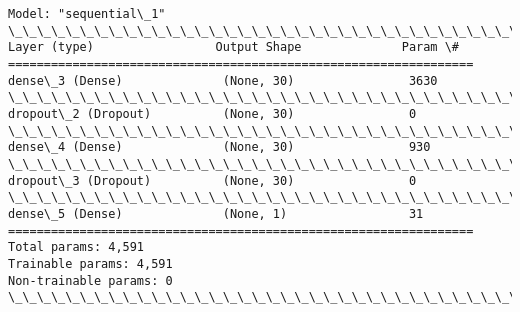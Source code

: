 \documentclass[11pt]{article}
\begin{document}
    \begin{Verbatim}[commandchars=\\\{\}]
Model: "sequential\_1"
\_\_\_\_\_\_\_\_\_\_\_\_\_\_\_\_\_\_\_\_\_\_\_\_\_\_\_\_\_\_\_\_\_\_\_\_\_\_\_\_\_\_\_\_\_\_\_\_\_\_\_\_\_\_\_\_\_\_\_\_\_\_\_\_\_
Layer (type)                 Output Shape              Param \#
=================================================================
dense\_3 (Dense)              (None, 30)                3630
\_\_\_\_\_\_\_\_\_\_\_\_\_\_\_\_\_\_\_\_\_\_\_\_\_\_\_\_\_\_\_\_\_\_\_\_\_\_\_\_\_\_\_\_\_\_\_\_\_\_\_\_\_\_\_\_\_\_\_\_\_\_\_\_\_
dropout\_2 (Dropout)          (None, 30)                0
\_\_\_\_\_\_\_\_\_\_\_\_\_\_\_\_\_\_\_\_\_\_\_\_\_\_\_\_\_\_\_\_\_\_\_\_\_\_\_\_\_\_\_\_\_\_\_\_\_\_\_\_\_\_\_\_\_\_\_\_\_\_\_\_\_
dense\_4 (Dense)              (None, 30)                930
\_\_\_\_\_\_\_\_\_\_\_\_\_\_\_\_\_\_\_\_\_\_\_\_\_\_\_\_\_\_\_\_\_\_\_\_\_\_\_\_\_\_\_\_\_\_\_\_\_\_\_\_\_\_\_\_\_\_\_\_\_\_\_\_\_
dropout\_3 (Dropout)          (None, 30)                0
\_\_\_\_\_\_\_\_\_\_\_\_\_\_\_\_\_\_\_\_\_\_\_\_\_\_\_\_\_\_\_\_\_\_\_\_\_\_\_\_\_\_\_\_\_\_\_\_\_\_\_\_\_\_\_\_\_\_\_\_\_\_\_\_\_
dense\_5 (Dense)              (None, 1)                 31
=================================================================
Total params: 4,591
Trainable params: 4,591
Non-trainable params: 0
\_\_\_\_\_\_\_\_\_\_\_\_\_\_\_\_\_\_\_\_\_\_\_\_\_\_\_\_\_\_\_\_\_\_\_\_\_\_\_\_\_\_\_\_\_\_\_\_\_\_\_\_\_\_\_\_\_\_\_\_\_\_\_\_\_
    \end{Verbatim}
\end{document}
